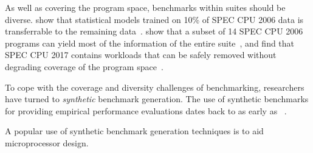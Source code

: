 As well as covering the program space, benchmarks within suites should be diverse.
\citeauthor{Ould-Ahmed-Vall2008} show that statistical models trained on 10\% of SPEC CPU 2006 data is transferrable to the remaining data~\cite{Ould-Ahmed-Vall2008}.
\citeauthor{Phansalkar2007} show that a subset of 14 SPEC CPU 2006 programs can yield most of the information of the entire suite~\cite{Phansalkar2007}, and
\citeauthor{Draft2018} find that SPEC CPU 2017 contains workloads that can be safely removed without degrading coverage of the program space~\cite{Draft2018}.

To cope with the coverage and diversity challenges of benchmarking, researchers have turned to \emph{synthetic} benchmark generation.
The use of synthetic benchmarks for providing empirical performance evaluations dates back to as early as \citeyear{Curnow1976}~\cite{Curnow1976}.






A popular use of synthetic benchmark generation techniques is to aid microprocessor design.



